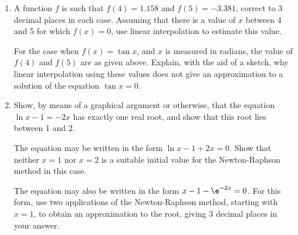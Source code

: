 \begin{problem}
    \begin{enumerate}
        \item A function $f$ is such that $f(4) = 1.158$ and $f(5) = -3.381$, correct to 3 decimal places in each case. Assuming that there is a value of $x$ between 4 and 5 for which $f(x) = 0$, use linear interpolation to estimate this value.
        
        For the case when $f(x) = \tan x$, and $x$ is measured in radians, the value of $f(4)$ and $f(5)$ are as given above. Explain, with the aid of a sketch, why linear interpolation using these values does not give an approximation to a solution of the equation $\tan x = 0$.

        \item Show, by means of a graphical argument or otherwise, that the equation $\ln{x-1} = -2x$ has exactly one real root, and show that this root lies between 1 and 2. 
        
        The equation may be written in the form $\ln{x-1} + 2x = 0$. Show that neither $x=1$ nor $x=2$ is a suitable initial value for the Newton-Raphson method in this case.

        The equation may also be written in the form $x - 1 - \e^{-2x} = 0$. For this form, use two applications of the Newton-Raphson method, starting with $x=1$, to obtain an approximation to the root, giving 3 decimal places in your answer.
    \end{enumerate}
\end{problem}
